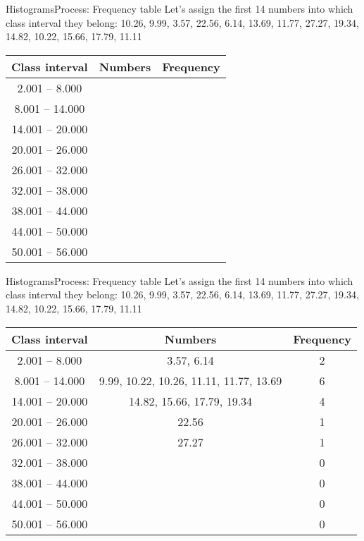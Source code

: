 \documentclass[xcolor=dvipsnames]{beamer}
\begin{document}
\begin{frame}{Histograms}{Process: Frequency table}
Let's assign the first 14 numbers into which class interval they belong:
10.26,  9.99,  3.57, 22.56,  6.14, 13.69, 11.77, 27.27, 19.34, 14.82, 10.22, 15.66, 17.79, 11.11 \pause
\begin{center}
	\begin{tabular}{|c|c|c|}
		\hline
		\textbf{Class interval} & \textbf{Numbers} & \textbf{Frequency} \\
		\hline \hline
		2.001 -- 8.000 & & \\  \hline 
		8.001 -- 14.000 & & \\  \hline 
		14.001 -- 20.000 & & \\  \hline 
		20.001 -- 26.000 & & \\  \hline 
		26.001 -- 32.000 & & \\  \hline 
		32.001 -- 38.000 & & \\  \hline 
		38.001 -- 44.000 & & \\  \hline 
		44.001 -- 50.000 & & \\  \hline 
		50.001 -- 56.000 & & \\ \hline 
	\end{tabular}
\end{center}
\end{frame}

\begin{frame}{Histograms}{Process: Frequency table}
	Let's assign the first 14 numbers into which class interval they belong:
	10.26,  9.99,  3.57, 22.56,  6.14, 13.69, 11.77, 27.27, 19.34, 14.82, 10.22, 15.66, 17.79, 11.11
	\begin{center}
		\begin{tabular}{|c|c|c|}
			\hline
			\textbf{Class interval} & \textbf{Numbers} & \textbf{Frequency} \\
			\hline \hline
			2.001 -- 8.000 & 3.57, 6.14 & 2\\ \hline 
			8.001 -- 14.000 & 9.99, 10.22, 10.26, 11.11, 11.77, 13.69 & 6 \\ \hline 
			14.001 -- 20.000 & 14.82, 15.66, 17.79, 19.34 & 4\\ \hline 
			20.001 -- 26.000 & 22.56 & 1 \\ \hline 
			26.001 -- 32.000 & 27.27 & 1 \\ \hline 
			32.001 -- 38.000 &  & 0 \\ \hline 
			38.001 -- 44.000 & & 0 \\ \hline 
			44.001 -- 50.000 & & 0 \\ \hline 
			50.001 -- 56.000 & & 0\\ \hline 
		\end{tabular}
	\end{center}
\end{frame}
\end{document}
